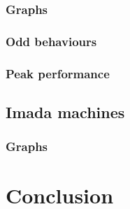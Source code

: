 \documentclass[a4paper,11pt,oneside]{book}
\begin{document}
\subsection{Graphs}
\subsection{Odd behaviours}
\subsection{Peak performance}

\section{Imada machines}
\subsection{Graphs}

\chapter{Conclusion}

\end{document}
